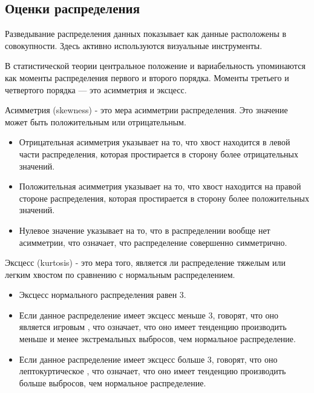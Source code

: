 \documentclass[12pt, a4paper]{article}
\begin{document}
{\subsection{Оценки распределения}

Разведывание распределения данных показывает как данные 
расположены в совокупности. Здесь активно используются 
визуальные инструменты.

\vspace{1em}

В статистической теории центральное положение и вариабельность 
упоминаются как моменты распределения первого и второго порядка. 
Моменты третьего и четвертого порядка — это асимметрия и эксцесс.

\vspace{1em}

Асимметрия (skewness) - это мера асимметрии распределения. Это 
значение может быть положительным или отрицательным.

\begin{itemize}
    \item Отрицательная асимметрия указывает на то, что хвост 
    находится в левой части распределения, которая простирается 
    в сторону более отрицательных значений.
    \item Положительная асимметрия указывает на то, что хвост 
    находится на правой стороне распределения, которая 
    простирается в сторону более положительных значений.
    \item Нулевое значение указывает на то, что в распределении 
    вообще нет асимметрии, что означает, что распределение 
    совершенно симметрично.
\end{itemize}

\vspace{1em}

Эксцесс (kurtosis) - это мера того, является ли распределение 
тяжелым или легким хвостом по сравнению с нормальным 
распределением.

\begin{itemize}
    \item Эксцесс нормального распределения равен 3.
    \item Если данное распределение имеет эксцесс меньше 3, 
    говорят, что оно является игровым , что означает, что 
    оно имеет тенденцию производить меньше и менее экстремальных 
    выбросов, чем нормальное распределение.
    \item Если данное распределение имеет эксцесс больше 3, 
    говорят, что оно лептокуртическое , что означает, что оно 
    имеет тенденцию производить больше выбросов, чем нормальное 
    распределение.
\end{itemize}

}
\end{document}
